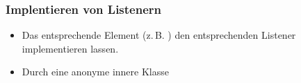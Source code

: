 


\subsubsection{Implentieren von Listenern}
\begin{itemize}\itemsep0em
	\item Das entsprechende Element (z.\,B. ) den entsprechenden Listener implementieren lassen.
	\item Durch eine anonyme innere Klasse
\end{itemize}
